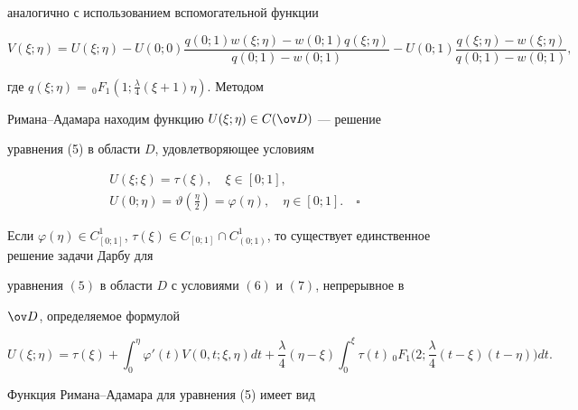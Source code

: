 аналогично с использованием вспомогательной функции 


$$ 


V(\xi;\eta)=U(\xi;\eta)-U(0;0) 


\frac{q(0;1)w(\xi;\eta)-w(0;1)q(\xi;\eta)} 


{q(0;1)-w(0;1)}-U(0;1) 


\frac{q(\xi;\eta)-w(\xi;\eta)}{q(0;1)-w(0;1)}, 


$$ 


где $q(\xi;\eta)=\,{}_0F_1(1;\frac{\lambda}{4}(\xi+1)\eta)$. Методом 


Римана--Адамара находим функцию $U(\xi;\eta)\in C(\ov D)$ --- решение 


уравнения (5) в области $D$, удовлетворяющее условиям 


\begin{gather} 


U(\xi;\xi)=\tau(\xi),\quad \xi\in[0;1],\\ 


U(0;\eta)=\vartheta(\tfrac{\eta}{2})=\varphi(\eta),\quad 


\eta\in[0;1].\quad\square 


\end{gather} 


 


\begin{thm} 


Если $\varphi(\eta)\in C^1_{[0;1]}$, $\tau(\xi)\in C_{[0;1]}\cap 


C^1_{(0;1)}$, то существует единственное решение задачи Дарбу для 


уравнения $(5)$ в области $D$ с условиями $(6)$ и $(7)$, непрерывное в 


$\ov D$, определяемое формулой 


\begin{equation} 


U(\xi;\eta)=\tau(\xi)+\int^\eta_0 \varphi'(t)V(0,t;\xi,\eta) 


dt+\frac{\lambda}{4}(\eta-\xi)\int^\xi_0 \tau(t)\,{}_0F_1 


\bigg(2;\frac{\lambda}{4}(t-\xi)(t-\eta)\bigg)dt. 


\end{equation} 


\end{thm} 


 


Функция Римана--Адамара для уравнения (5) имеет вид 


